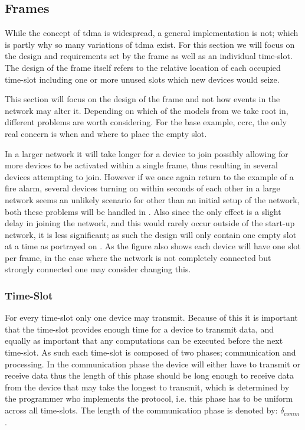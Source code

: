 \subsection{Frames}\label{GCRC:frame}
While the concept of \gls{tdma} is widespread, a general implementation is not; which is partly why so many variations of \gls{tdma} exist.
For this section we will focus on the design and requirements set by the frame as well as an individual time-slot.
The design of the frame itself refers to the relative location of each occupied time-slot including one or more unused slots which new devices would seize.

This section will focus on the design of the frame and not how events in the network may alter it.
Depending on which of the models from  we take root in, different problems are worth considering.
For the base example, \gls{ccrc}, the only real concern is when and where to place the empty slot.

In a larger network it will take longer for a device to join possibly allowing for more devices to be activated within a single frame, thus resulting in several devices attempting to join.
However if we once again return to the example of a fire alarm, several devices turning on within seconds of each other in a large network seems an unlikely scenario for other than an initial setup of the network, both these problems will be handled in .
Also since the only effect is a slight delay in joining the network, and this would rarely occur outside of the start-up network, it is less significant; as such the design will only contain one empty slot at a time as portrayed on .
As the figure also shows each device will have one slot per frame, in the case where the network is not completely connected but strongly connected one may consider changing this.


\subsubsection*{Time-Slot}
For every time-slot only one device may transmit.
Because of this it is important that the time-slot provides enough time for a device to transmit data, and equally as important that any computations can be executed before the next time-slot.
As such each time-slot is composed of two phases; communication and processing.
In the communication phase the device will either have to transmit or receive data thus the length of this phase should be long enough to receive data from the device that may take the longest to transmit, which is determined by the programmer who implements the protocol, i.e. this phase has to be uniform across all time-slots.
The length of the communication phase is denoted by: $\delta_{comm}$.

